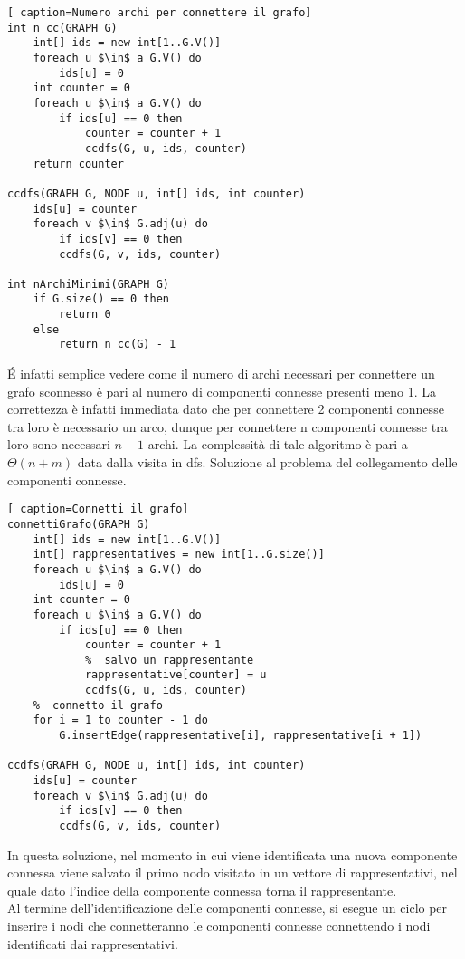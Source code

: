 \documentclass[../cheatSheetAlgoritmi.tex]{subfiles}
\begin{document}
\begin{lstlisting}[ caption=Numero archi per connettere il grafo]
int n_cc(GRAPH G)
	int[] ids = new int[1..G.V()]
  	foreach u $\in$ a G.V() do
    	ids[u] = 0
  	int counter = 0
  	foreach u $\in$ a G.V() do
    	if ids[u] == 0 then
      		counter = counter + 1
      		ccdfs(G, u, ids, counter)
  	return counter

ccdfs(GRAPH G, NODE u, int[] ids, int counter)
	ids[u] = counter
  	foreach v $\in$ G.adj(u) do
    	if ids[v] == 0 then
      	ccdfs(G, v, ids, counter)

int nArchiMinimi(GRAPH G)
	if G.size() == 0 then
    	return 0
  	else
    	return n_cc(G) - 1
\end{lstlisting}
É infatti semplice vedere come il numero di archi necessari per connettere un grafo sconnesso è pari al numero di componenti connesse presenti meno 1. La correttezza è infatti immediata dato che per connettere 2 componenti connesse tra loro è necessario un arco, dunque per connettere n componenti connesse tra loro sono necessari $n-1$ archi. La complessità di tale algoritmo è pari a $\Theta(n + m)$ data dalla visita in dfs. Soluzione al problema del collegamento delle componenti connesse.
\begin{lstlisting}[ caption=Connetti il grafo]
connettiGrafo(GRAPH G)
	int[] ids = new int[1..G.V()]
  	int[] rappresentatives = new int[1..G.size()]
  	foreach u $\in$ a G.V() do
    	ids[u] = 0
  	int counter = 0
  	foreach u $\in$ a G.V() do
    	if ids[u] == 0 then
      		counter = counter + 1
      		%  salvo un rappresentante
      		rappresentative[counter] = u
      		ccdfs(G, u, ids, counter)
  	%  connetto il grafo
  	for i = 1 to counter - 1 do
  		G.insertEdge(rappresentative[i], rappresentative[i + 1])
  
ccdfs(GRAPH G, NODE u, int[] ids, int counter)
	ids[u] = counter
  	foreach v $\in$ G.adj(u) do
    	if ids[v] == 0 then
      	ccdfs(G, v, ids, counter)
\end{lstlisting}
In questa soluzione, nel momento in cui viene identificata una nuova componente connessa viene salvato il primo nodo visitato in un vettore di rappresentativi, nel quale dato l'indice della componente connessa torna il rappresentante. \\
Al termine dell'identificazione delle componenti connesse, si esegue un ciclo per inserire i nodi che connetteranno le componenti connesse connettendo i nodi identificati dai rappresentativi.
\end{document}
